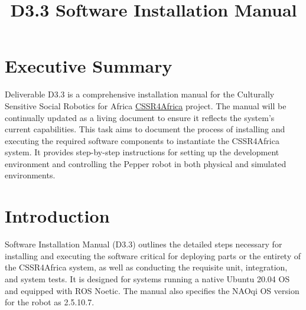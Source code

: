 \documentclass{CSSRforAfrica}
\newcommand{\blank}{~\\}
\begin{document}



\title{D3.3 Software Installation Manual}    

\partner{}                                      



\maketitle

\section*{Executive Summary}
Deliverable D3.3 is a comprehensive installation manual for the Culturally Sensitive Social Robotics for Africa \href{https://cssr4africa.github.io/}{CSSR4Africa} project. The manual will be continually updated as a living document to ensure it reflects the system's current capabilities. This task aims to document the process of installing and executing the required software components to instantiate the CSSR4Africa system. It provides step-by-step instructions for setting up the development environment and controlling the Pepper robot in both physical and simulated environments.
\label{executive_summary}

\pagebreak
\tableofcontents
\pagebreak


\pagebreak


\section{Introduction}
Software Installation Manual (D3.3) outlines the detailed steps necessary for installing and executing the software critical for deploying parts or the entirety of the CSSR4Africa system, as well as conducting the requisite unit, integration, and system tests. It is designed for systems running a native Ubuntu 20.04 OS and equipped with ROS Noetic. The manual also specifies the NAOqi OS version for the robot as 2.5.10.7.
\end{document}
